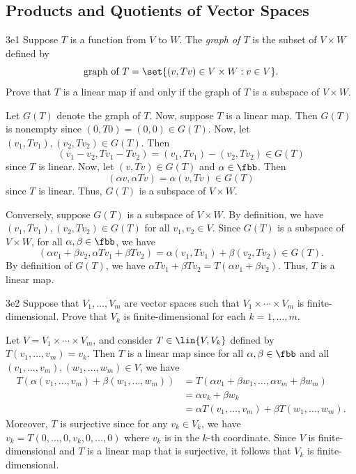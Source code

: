 \subsection{Products and Quotients of Vector Spaces}

\begin{exercise}{3e1}
    Suppose $T$ is a function from $V$ to $W$.
	The \textit{graph of $T$} is the subset of $V \times W$ defined by
    \[
    	\text{graph of } T = \set{(v, Tv) \in V \times W : v \in V}.
    \]
    Prove that $T$ is a linear map if and only if the graph of $T$ is a subspace of $V \times W$.
\end{exercise}

\begin{sol}
    Let $G(T)$ denote the graph of $T$.
	Now, suppose $T$ is a linear map.
	Then $G(T)$ is nonempty since $(0, T0) = (0, 0) \in G(T)$.
	Now, let $(v_1, Tv_1), (v_2, Tv_2) \in G(T)$.
	Then
    \[
    	(v_1 - v_2, Tv_1 - Tv_2) = (v_1, Tv_1) - (v_2, Tv_2) \in G(T)
    \]
    since $T$ is linear.
	Now, let $(v, Tv) \in G(T)$ and $\alpha \in \fbb$.
	Then
    \[
    	(\alpha v, \alpha Tv) = \alpha (v, Tv) \in G(T)
    \]
    since $T$ is linear.
	Thus, $G(T)$ is a subspace of $V \times W$.

    Conversely, suppose $G(T)$ is a subspace of $V \times W$.
	By definition, we have $(v_1, Tv_1), (v_2, Tv_2) \in G(T)$ for all $v_1, v_2 \in V$.
	Since $G(T)$ is a subspace of $V \times W$, for all $\alpha, \beta \in \fbb$, we have
    \[
    	(\alpha v_1 + \beta v_2, \alpha Tv_1 + \beta Tv_2) = \alpha (v_1, Tv_1) + \beta (v_2, Tv_2) \in G(T).
    \]
    By definition of $G(T)$, we have $\alpha Tv_1 + \beta Tv_2 = T(\alpha v_1 + \beta v_2)$.
	Thus, $T$ is a linear map.
\end{sol}

\begin{exercise}{3e2}
    Suppose that $V_1, \ldots, V_m$ are vector spaces such that $V_1 \times \cdots \times V_m$ is finite-dimensional.
	Prove that $V_k$ is finite-dimensional for each $k = 1, \ldots, m$.
\end{exercise}

\begin{sol}
    Let $V = V_1 \times \cdots \times V_m$, and consider $T \in \lin{V, V_k}$ defined by $T(v_1, \ldots, v_m) = v_k$.
	Then $T$ is a linear map since for all $\alpha, \beta \in \fbb$ and all $(v_1, \ldots, v_m), (w_1, \ldots, w_m) \in V$, we have
    \begin{align*}
        T(\alpha (v_1, \ldots, v_m) + \beta (w_1, \ldots, w_m)) &= T(\alpha v_1 + \beta w_1, \ldots, \alpha v_m + \beta w_m) \\
        &= \alpha v_k + \beta w_k \\
        &= \alpha T(v_1, \ldots, v_m) + \beta T(w_1, \ldots, w_m).
    \end{align*}
    Moreover, $T$ is surjective since for any $v_k \in V_k$, we have $v_k = T(0, \ldots, 0, v_k, 0, \ldots, 0)$ where $v_k$ is in the $k$-th coordinate.
	Since $V$ is finite-dimensional and $T$ is a linear map that is surjective, it follows that $V_k$ is finite-dimensional.
\end{sol}

